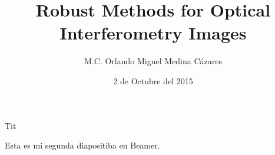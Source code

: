 \documentclass{beamer}
\title{Robust Methods for Optical \\ Interferometry
    Images}
\author{M.C. Orlando Miguel Medina C\'azares}
\date[2009]{2 de Octubre del 2015}
\institute[CIO]{Centro de Investigaciones en \'Optica}
\begin{document}
\frame{\maketitle}


\begin{frame}{Tit}
 
\end{frame}

\begin{frame}
  Esta es mi segunda diapositiba en Beamer.

\end{frame}
\end{document}
